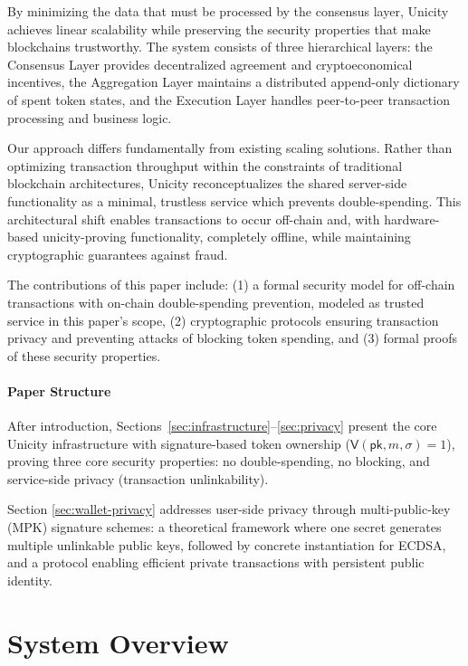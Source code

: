 \documentclass{article}
\newcommand{\sigver}[0]{\mathsf{V}}
\newcommand{\pubkey}[0]{\mathsf{pk}}
\begin{document}
By minimizing the data that must be processed by the consensus layer, Unicity achieves linear scalability while preserving the security properties that make blockchains trustworthy. The system consists of three hierarchical layers: the Consensus Layer provides decentralized agreement and cryptoeconomical incentives, the Aggregation Layer maintains a distributed append-only dictionary of spent token states, and the Execution Layer handles peer-to-peer transaction processing and business logic.

Our approach differs fundamentally from existing scaling solutions. Rather than optimizing transaction throughput within the constraints of traditional blockchain architectures, Unicity reconceptualizes the shared server-side functionality as a minimal, trustless service which prevents double-spending. This architectural shift enables transactions to occur off-chain and, with hardware-based unicity-proving functionality, completely offline, while maintaining cryptographic guarantees against fraud.

The contributions of this paper include: (1) a formal security model for off-chain transactions with on-chain double-spending prevention, modeled as trusted service in this paper's scope, (2) cryptographic protocols ensuring transaction privacy and preventing attacks of blocking token spending, and (3) formal proofs of these security properties.

\paragraph{Paper Structure}
After introduction, Sections~\ref{sec:infrastructure}--\ref{sec:privacy} present the core Unicity infrastructure with signature-based token ownership ($\sigver(\pubkey, m, \sigma) = 1$), proving three core security properties: no double-spending, no blocking, and service-side privacy (transaction unlinkability).

Section \ref{sec:wallet-privacy} addresses user-side privacy through multi-public-key (MPK) signature schemes: a theoretical framework where one secret generates multiple unlinkable public keys, followed by concrete instantiation for ECDSA, and a protocol enabling efficient private transactions with persistent public identity.

\section{System Overview}\label{sec:overview}
\end{document}
